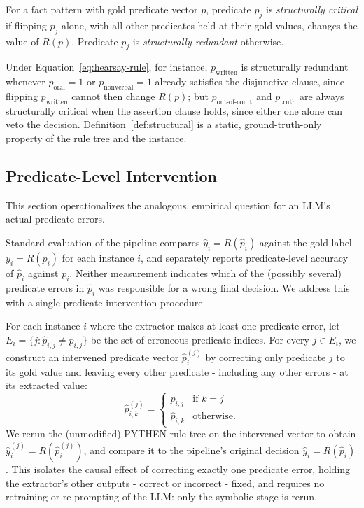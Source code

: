 \begin{definition}
\label{def:structural}
For a fact pattern with gold predicate vector $p$, predicate $p_j$ is \emph{structurally critical} if flipping $p_j$ alone, with all other predicates held at their gold values, changes the value of $R(p)$. Predicate $p_j$ is \emph{structurally redundant} otherwise.
\end{definition}

Under Equation~\ref{eq:hearsay-rule}, for instance, $p_{\text{written}}$ is structurally redundant whenever $p_{\text{oral}} = 1$ or $p_{\text{nonverbal}} = 1$ already satisfies the disjunctive clause, since flipping $p_{\text{written}}$ cannot then change $R(p)$; but $p_{\text{out-of-court}}$ and $p_{\text{truth}}$ are always structurally critical when the assertion clause holds, since either one alone can veto the decision. Definition~\ref{def:structural} is a static, ground-truth-only property of the rule tree and the instance.
 
\subsection{Predicate-Level Intervention}
\label{subsec:intervention}
This section operationalizes the analogous, empirical question for an LLM's actual predicate errors.

Standard evaluation of the pipeline compares $\hat{y}_i = R(\hat{p}_i)$ against the gold label $y_i = R(p_i)$ for each instance $i$, and separately reports predicate-level accuracy of $\hat{p}_i$ against $p_i$. Neither measurement indicates which of the (possibly several) predicate errors in $\hat{p}_i$ was responsible for a wrong final decision. We address this with a single-predicate intervention procedure.

For each instance $i$ where the extractor makes at least one predicate error, let $E_i = \{j : \hat{p}_{i,j} \neq p_{i,j}\}$ be the set of erroneous predicate indices. For every $j \in E_i$, we construct an intervened predicate vector $\hat{p}_i^{(j)}$ by correcting only predicate $j$ to its gold value and leaving every other predicate - including any other errors - at its extracted value:
\begin{equation}
\label{eq:intervention}
\hat{p}_{i,k}^{(j)} =
\begin{cases}
p_{i,j} & \text{if } k = j \\
\hat{p}_{i,k} & \text{otherwise.}
\end{cases}
\end{equation}
We rerun the (unmodified) PYTHEN rule tree on the intervened vector to obtain $\hat{y}_i^{(j)} = R(\hat{p}_i^{(j)})$, and compare it to the pipeline's original decision $\hat{y}_i = R(\hat{p}_i)$. This isolates the causal effect of correcting exactly one predicate error, holding the extractor's other outputs - correct or incorrect - fixed, and requires no retraining or re-prompting of the LLM: only the symbolic stage is rerun.

